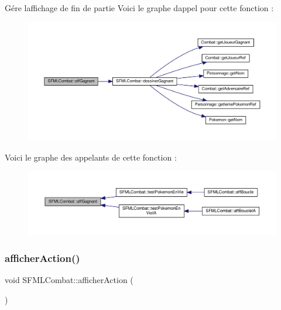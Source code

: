 Gére l\textquotesingle{}affichage de fin de partie Voici le graphe d\textquotesingle{}appel pour cette fonction \+:\nopagebreak
\begin{figure}[H]
\begin{center}
\leavevmode
\includegraphics[width=350pt]{class_s_f_m_l_combat_ace8cd35d8b2bbc86478a7a28bf0996b4_cgraph}
\end{center}
\end{figure}
Voici le graphe des appelants de cette fonction \+:\nopagebreak
\begin{figure}[H]
\begin{center}
\leavevmode
\includegraphics[width=350pt]{class_s_f_m_l_combat_ace8cd35d8b2bbc86478a7a28bf0996b4_icgraph}
\end{center}
\end{figure}
\mbox{\label{class_s_f_m_l_combat_acc968da97d4c933f516e67b0356e3d73}} 
\subsubsection{\texorpdfstring{afficher\+Action()}{afficherAction()}}
{\footnotesize\ttfamily void S\+F\+M\+L\+Combat\+::afficher\+Action (\begin{DoxyParamCaption}{ }\end{DoxyParamCaption})\hspace{0.3cm}{\ttfamily [private]}}



